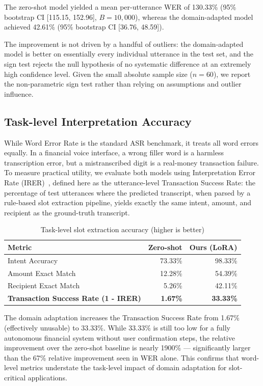 \documentclass[11pt,a4paper]{article}
\begin{document}
The zero-shot model yielded a mean per-utterance WER of 130.33\%
(95\% bootstrap CI [115.15, 152.96], $B=10{,}000$), whereas the
domain-adapted model achieved 42.61\% (95\% bootstrap CI
[36.76, 48.59]).

The improvement is not driven by a handful of outliers: the domain-adapted
model is better on essentially every individual utterance in the test set,
and the sign test rejects the null hypothesis of no systematic difference
at an extremely high confidence level. Given the small absolute sample
size ($n=60$), we report the non-parametric sign test rather than relying
on assumptions and outlier influence.

\subsection{Task-level Interpretation Accuracy}

While Word Error Rate is the standard ASR benchmark, it treats all word
errors equally. In a financial voice interface, a wrong filler word is a
harmless transcription error, but a mistranscribed digit is a real-money
transaction failure. To measure practical utility, we evaluate both models
using Interpretation Error Rate (IRER)~\cite{fu2022multitask}, defined
here as the utterance-level Transaction Success Rate: the percentage of
test utterances where the predicted transcript, when parsed by a
rule-based slot extraction pipeline, yields exactly the same intent,
amount, and recipient as the ground-truth transcript.

\begin{table}[H]
\centering
\caption{Task-level slot extraction accuracy (higher is better)}
\label{tab:task_eval}
\begin{tabular}{lrr}
\toprule
\textbf{Metric} & \textbf{Zero-shot} & \textbf{Ours (LoRA)} \\
\midrule
Intent Accuracy & 73.33\% & 98.33\% \\
Amount Exact Match & 12.28\% & 54.39\% \\
Recipient Exact Match & 5.26\% & 42.11\% \\
\midrule
\textbf{Transaction Success Rate (1 - IRER)} & \textbf{1.67\%} & \textbf{33.33\%} \\
\bottomrule
\end{tabular}
\end{table}

The domain adaptation increases the Transaction Success Rate from 1.67\%
(effectively unusable) to 33.33\%. While 33.33\% is still too low for a
fully autonomous financial system without user confirmation steps, the
relative improvement over the zero-shot baseline is nearly 1900\% ---
significantly larger than the 67\% relative improvement seen in WER alone.
This confirms that word-level metrics understate the task-level impact of
domain adaptation for slot-critical applications.
\end{document}

